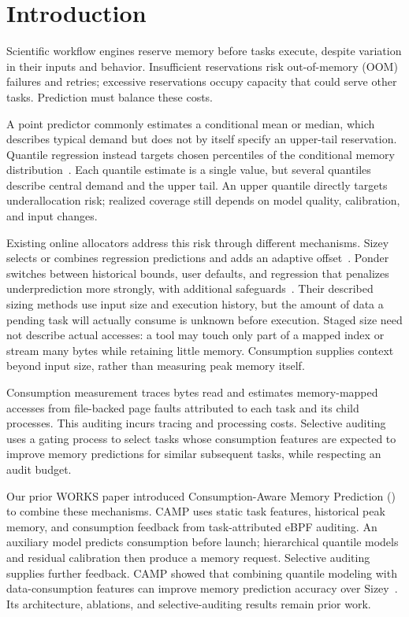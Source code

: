\section{Introduction}
\label{sec:Introduction}
Scientific workflow engines reserve memory before tasks execute, despite
variation in their inputs and behavior. Insufficient reservations risk
out-of-memory (OOM) failures and retries; excessive reservations occupy
capacity that could serve other tasks. Prediction must balance these costs.

A point predictor commonly estimates a conditional mean or median, which
describes typical demand but does not by itself specify an upper-tail
reservation. Quantile regression instead targets chosen percentiles of
the conditional memory distribution~\cite{meinshausen2006quantile}.
Each quantile estimate is a single value, but several quantiles describe
central demand and the upper tail. An upper quantile directly targets
underallocation risk; realized coverage still depends on model quality,
calibration, and input changes.

Existing online allocators address this risk through different mechanisms.
Sizey selects or combines regression predictions and adds an adaptive
offset~\cite{bader2024sizey}. Ponder switches between historical bounds,
user defaults, and regression that penalizes underprediction more strongly,
with additional safeguards~\cite{lehmann2024ponder}. Their described sizing
methods use input size and execution history, but the amount of data a
pending task will actually consume is unknown before execution. Staged size need not
describe actual accesses: a tool may touch only part of a mapped index or
stream many bytes while retaining little memory. Consumption supplies
context beyond input size, rather than measuring peak memory itself.

Consumption measurement traces bytes read and estimates memory-mapped
accesses from file-backed page faults attributed to each task and its
child processes. This auditing incurs tracing and processing costs.
Selective auditing uses a gating process to select tasks whose consumption
features are expected to improve memory predictions for similar subsequent
tasks, while respecting an audit budget.

Our prior WORKS paper introduced Consumption-Aware Memory Prediction
(\toolname)~\cite{camp2026works} to combine these mechanisms. CAMP uses
static task features, historical peak memory, and consumption feedback
from task-attributed eBPF auditing. An auxiliary model predicts consumption
before launch; hierarchical quantile models and residual calibration then
produce a memory request. Selective auditing supplies further feedback.
CAMP showed that combining quantile modeling with data-consumption
features can improve memory prediction accuracy over Sizey~\cite{camp2026works}.
Its architecture, ablations, and selective-auditing results remain prior work.

